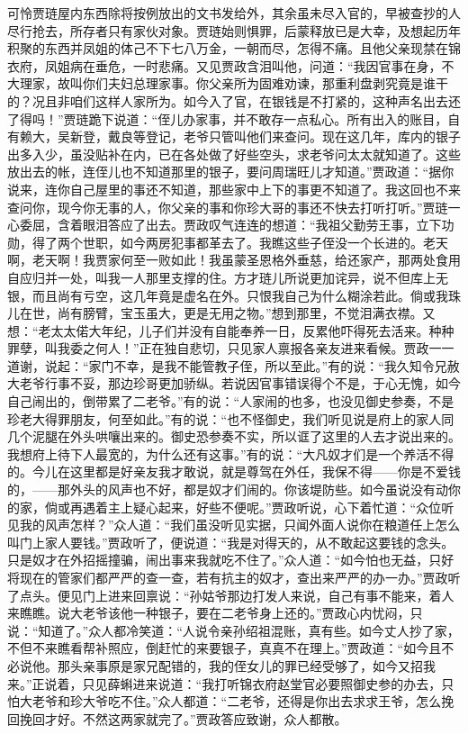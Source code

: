 \begin{parag}
    可怜贾琏屋内东西除将按例放出的文书发给外，其余虽未尽入官的，早被查抄的人尽行抢去，所存者只有家伙对象。贾琏始则惧罪，后蒙释放已是大幸，及想起历年积聚的东西并凤姐的体己不下七八万金，一朝而尽，怎得不痛。且他父亲现禁在锦衣府，凤姐病在垂危，一时悲痛。又见贾政含泪叫他，问道：“我因官事在身，不大理家，故叫你们夫妇总理家事。你父亲所为固难劝谏，那重利盘剥究竟是谁干的？况且非咱们这样人家所为。如今入了官，在银钱是不打紧的，这种声名出去还了得吗！”贾琏跪下说道：“侄儿办家事，并不敢存一点私心。所有出入的账目，自有赖大，吴新登，戴良等登记，老爷只管叫他们来查问。现在这几年，库内的银子出多入少，虽没贴补在内，已在各处做了好些空头，求老爷问太太就知道了。这些放出去的帐，连侄儿也不知道那里的银子，要问周瑞旺儿才知道。”贾政道：“据你说来，连你自己屋里的事还不知道，那些家中上下的事更不知道了。我这回也不来查问你，现今你无事的人，你父亲的事和你珍大哥的事还不快去打听打听。”贾琏一心委屈，含着眼泪答应了出去。贾政叹气连连的想道：“我祖父勤劳王事，立下功勋，得了两个世职，如今两房犯事都革去了。我瞧这些子侄没一个长进的。老天啊，老天啊！我贾家何至一败如此！我虽蒙圣恩格外垂慈，给还家产，那两处食用自应归并一处，叫我一人那里支撑的住。方才琏儿所说更加诧异，说不但库上无银，而且尚有亏空，这几年竟是虚名在外。只恨我自己为什么糊涂若此。倘或我珠儿在世，尚有膀臂，宝玉虽大，更是无用之物。”想到那里，不觉泪满衣襟。又想：“老太太偌大年纪，儿子们并没有自能奉养一日，反累他吓得死去活来。种种罪孽，叫我委之何人！”正在独自悲切，只见家人禀报各亲友进来看候。贾政一一道谢，说起：“家门不幸，是我不能管教子侄，所以至此。”有的说：“我久知令兄赦大老爷行事不妥，那边珍哥更加骄纵。若说因官事错误得个不是，于心无愧，如今自己闹出的，倒带累了二老爷。”有的说：“人家闹的也多，也没见御史参奏，不是珍老大得罪朋友，何至如此。”有的说：“也不怪御史，我们听见说是府上的家人同几个泥腿在外头哄嚷出来的。御史恐参奏不实，所以诓了这里的人去才说出来的。我想府上待下人最宽的，为什么还有这事。”有的说：“大凡奴才们是一个养活不得的。今儿在这里都是好亲友我才敢说，就是尊驾在外任，我保不得——你是不爱钱的，——那外头的风声也不好，都是奴才们闹的。你该堤防些。如今虽说没有动你的家，倘或再遇着主上疑心起来，好些不便呢。”贾政听说，心下着忙道：“众位听见我的风声怎样？”众人道：“我们虽没听见实据，只闻外面人说你在粮道任上怎么叫门上家人要钱。”贾政听了，便说道：“我是对得天的，从不敢起这要钱的念头。只是奴才在外招摇撞骗，闹出事来我就吃不住了。”众人道：“如今怕也无益，只好将现在的管家们都严严的查一查，若有抗主的奴才，查出来严严的办一办。”贾政听了点头。便见门上进来回禀说：“孙姑爷那边打发人来说，自己有事不能来，着人来瞧瞧。说大老爷该他一种银子，要在二老爷身上还的。”贾政心内忧闷，只说：“知道了。”众人都冷笑道：“人说令亲孙绍祖混账，真有些。如今丈人抄了家，不但不来瞧看帮补照应，倒赶忙的来要银子，真真不在理上。”贾政道：“如今且不必说他。那头亲事原是家兄配错的，我的侄女儿的罪已经受够了，如今又招我来。”正说着，只见薛蝌进来说道：“我打听锦衣府赵堂官必要照御史参的办去，只怕大老爷和珍大爷吃不住。”众人都道：“二老爷，还得是你出去求求王爷，怎么挽回挽回才好。不然这两家就完了。”贾政答应致谢，众人都散。
\end{parag}


